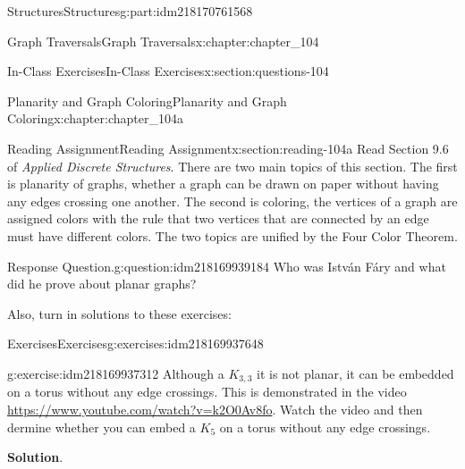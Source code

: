 \documentclass[oneside,10pt,]{book}
\newcommand{\blocktitlefont}{\relax}
\numberwithin{equation}{section}
\begin{document}
\begin{partptx}{Structures}{}{Structures}{}{}{g:part:idm218170761568}
\begin{chapterptx}{Graph Traversals}{}{Graph Traversals}{}{}{x:chapter:chapter_104}
\begin{sectionptx}{In-Class Exercises}{}{In-Class Exercises}{}{}{x:section:questions-104}
\end{sectionptx}
\end{chapterptx}
%
\typeout{************************************************}
\typeout{************************************************}
%
\begin{chapterptx}{Planarity and Graph Coloring}{}{Planarity and Graph Coloring}{}{}{x:chapter:chapter_104a}
%
%
%
%
%
\typeout{************************************************}
\typeout{************************************************}
%
\begin{sectionptx}{Reading Assignment}{}{Reading Assignment}{}{}{x:section:reading-104a}
Read Section 9.6 of \emph{Applied Discrete Structures}. There are two main topics of this section. The first is planarity of graphs, whether a graph can be drawn on paper without having any edges crossing one another.  The second is coloring, the vertices of a graph are assigned colors with the rule that two vertices that are connected by an edge must have different colors.  The two topics are unified by the Four Color Theorem.%
\begin{question}{Response Question.}{g:question:idm218169939184}%
Who was István Fáry and what did he prove about planar graphs?%
\end{question}
Also, turn in solutions to these exercises:%
%
%
\typeout{************************************************}
\typeout{************************************************}
%
\begin{exercises-subsection-numberless}{Exercises}{}{Exercises}{}{}{g:exercises:idm218169937648}
\par\medskip\noindent%
%
\begin{exercisegroup}
\begin{divisionexerciseeg}{1}{}{}{g:exercise:idm218169937312}%
Although a \(K_{3,3}\) it is not planar, it can be embedded on a torus without any edge crossings.  This is demonstrated in the video \href{https://www.youtube.com/watch?v=k2O0Av_8_fo}{https:\slash{}\slash{}www.youtube.com\slash{}watch?v=k2O0Av\textunderscore{}8\textunderscore{}fo}.  Watch the video and then dermine whether you can embed a \(K_5\) on a torus without any edge crossings.%
\par\smallskip%
\noindent\textbf{\blocktitlefont Solution}.\hypertarget{g:solution:idm218169934752}{}\quad{}\textunderscore{}%
\end{divisionexerciseeg}%

\end{exercisegroup}
\end{exercises-subsection-numberless}
\end{sectionptx}
\end{chapterptx}
\end{partptx}
\end{document}
